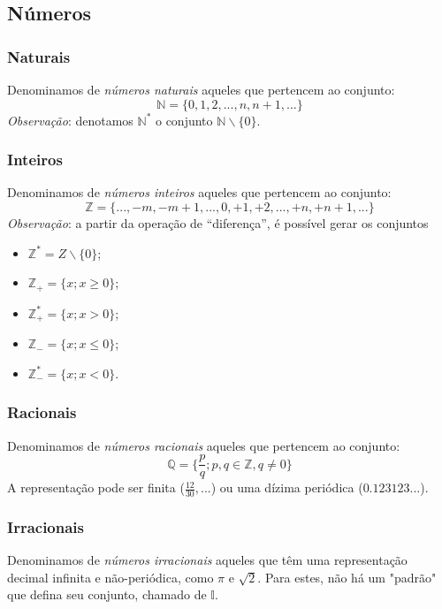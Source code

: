 \documentclass{article}
\begin{document}
\subsection{Números}
\subsubsection{Naturais}
Denominamos de \emph{números naturais} aqueles que pertencem ao conjunto:
\begin{displaymath}
    \mathbb{N} = \{0, 1, 2, ..., n, n + 1, ...\}
\end{displaymath}
\emph{Observação}: denotamos $\mathbb{N}^*$ o conjunto $\mathbb{N} \backslash \{0\}$.

\subsubsection{Inteiros}
Denominamos de \emph{números inteiros} aqueles que pertencem ao conjunto:
\begin{displaymath}
    \mathbb{Z} = \{..., -m, -m + 1, ..., 0, +1, +2, ..., +n, +n + 1, ...\}
\end{displaymath}
\emph{Observação}: a partir da operação de \enquote{diferença}, é possível gerar os conjuntos
\begin{itemize}
    \item $\mathbb{Z}^* = Z \backslash \{0\}$;
    \item $\mathbb{Z}_+ = \{ x; x \ge 0 \}$;
    \item $\mathbb{Z}^*_+ = \{ x; x > 0 \}$;
    \item $\mathbb{Z}_- = \{ x; x \leq 0 \}$;
    \item $\mathbb{Z}^*_- = \{ x; x < 0 \}$.
\end{itemize}

\subsubsection{Racionais}
Denominamos de \emph{números racionais} aqueles que pertencem ao conjunto:
\begin{displaymath}
    \mathbb{Q} = \{\frac{p}{q} ; p, q \in \mathbb{Z}, q \ne 0 \}
\end{displaymath}
A representação pode ser finita ($\frac{12}{30},...$) ou uma dízima periódica 
($0.123123...$).

\subsubsection{Irracionais}
Denominamos de \emph{números irracionais} aqueles que têm uma representação decimal infinita e não-periódica, como $\pi$ e $\sqrt{2}$. Para estes, não há um "padrão" que defina seu conjunto, chamado de $\mathbb{I}$.
\end{document}
